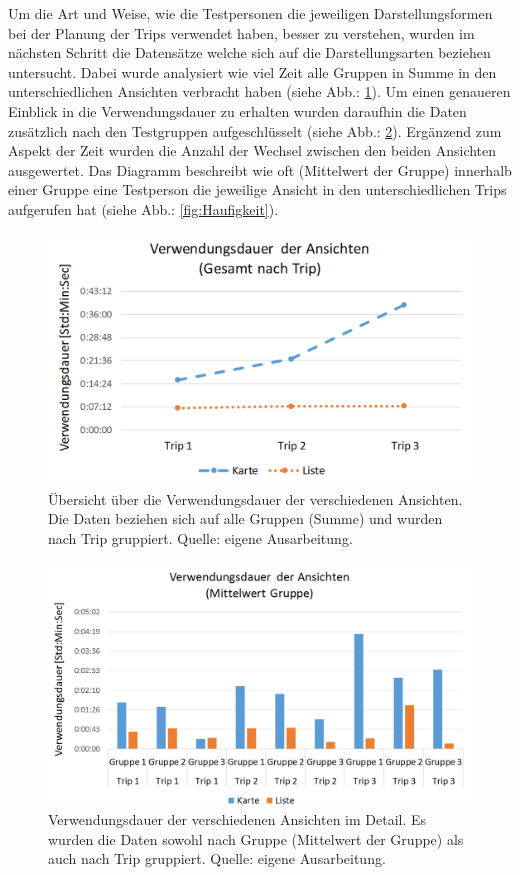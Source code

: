 \documentclass[Bachelorarbeit.tex]{subfiles}
\begin{document}
Um die Art und Weise, wie die Testpersonen die jeweiligen Darstellungsformen bei der Planung der Trips verwendet haben, besser zu verstehen, wurden im nächsten Schritt die Datensätze welche sich auf die Darstellungsarten beziehen untersucht. 
Dabei wurde analysiert wie viel Zeit alle Gruppen in Summe in den unterschiedlichen Ansichten verbracht haben (siehe Abb.: \ref{fig:VerwendungsdauerTrip}).
Um einen genaueren Einblick in die Verwendungsdauer zu erhalten wurden daraufhin die Daten zusätzlich nach den Testgruppen aufgeschlüsselt (siehe Abb.: \ref{fig:VerwendungsdauerGruppe}).
Ergänzend zum Aspekt der Zeit wurden die Anzahl der Wechsel zwischen den beiden Ansichten ausgewertet. 
Das Diagramm beschreibt wie oft (Mittelwert der Gruppe) innerhalb einer Gruppe eine Testperson die jeweilige Ansicht in den unterschiedlichen Trips aufgerufen hat (siehe Abb.: \ref{fig:Haufigkeit}). 

\begin{figure}[H]
\centering
\includegraphics[width=0.7\linewidth]{img/Evaluation/Darstellungsformen/VerwendungsdauerTrip}
\caption[Verwendungsdauer der verschiedenen Ansichten.]{Übersicht über die Verwendungsdauer der verschiedenen Ansichten. Die Daten beziehen sich auf alle Gruppen (Summe) und wurden nach Trip gruppiert. Quelle: eigene Ausarbeitung.}
\label{fig:VerwendungsdauerTrip}
\end{figure}

\begin{figure}[H]
\centering
\includegraphics[width=0.7\linewidth]{img/Evaluation/Darstellungsformen/VerwendungsdauerGruppe}
\caption[Übersicht Verwendungsdauer Ansichten (Detail)]{Verwendungsdauer der verschiedenen Ansichten im Detail. Es wurden die Daten sowohl nach Gruppe (Mittelwert der Gruppe) als auch nach Trip gruppiert. Quelle: eigene Ausarbeitung.}
\label{fig:VerwendungsdauerGruppe}
\end{figure}
\end{document}
